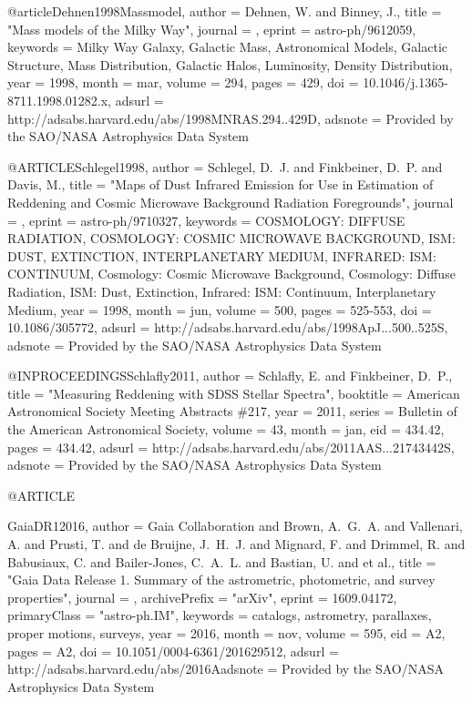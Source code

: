 \documentclass[apj]{emulateapj}
\begin{document}
{{{{{{{{{{{{@article{Dehnen1998Massmodel,
   author = {{Dehnen}, W. and {Binney}, J.},
    title = "{Mass models of the Milky Way}",
  journal = {\mnras},
   eprint = {astro-ph/9612059},
 keywords = {Milky Way Galaxy, Galactic Mass, Astronomical Models, Galactic Structure, Mass Distribution, Galactic Halos, Luminosity, Density Distribution},
     year = 1998,
    month = mar,
   volume = 294,
    pages = {429},
      doi = {10.1046/j.1365-8711.1998.01282.x},
   adsurl = {http://adsabs.harvard.edu/abs/1998MNRAS.294..429D},
  adsnote = {Provided by the SAO/NASA Astrophysics Data System}
}


@ARTICLE{Schlegel1998,
   author = {{Schlegel}, D.~J. and {Finkbeiner}, D.~P. and {Davis}, M.},
    title = "{Maps of Dust Infrared Emission for Use in Estimation of Reddening and Cosmic Microwave Background Radiation Foregrounds}",
  journal = {\apj},
   eprint = {astro-ph/9710327},
 keywords = {COSMOLOGY: DIFFUSE RADIATION, COSMOLOGY: COSMIC MICROWAVE BACKGROUND, ISM: DUST, EXTINCTION, INTERPLANETARY MEDIUM, INFRARED: ISM: CONTINUUM, Cosmology: Cosmic Microwave Background, Cosmology: Diffuse Radiation, ISM: Dust, Extinction, Infrared: ISM: Continuum, Interplanetary Medium},
     year = 1998,
    month = jun,
   volume = 500,
    pages = {525-553},
      doi = {10.1086/305772},
   adsurl = {http://adsabs.harvard.edu/abs/1998ApJ...500..525S},
  adsnote = {Provided by the SAO/NASA Astrophysics Data System}
}



@INPROCEEDINGS{Schlafly2011,
   author = {{Schlafly}, E. and {Finkbeiner}, D.~P.},
    title = "{Measuring Reddening with SDSS Stellar Spectra}",
booktitle = {American Astronomical Society Meeting Abstracts \#217},
     year = 2011,
   series = {Bulletin of the American Astronomical Society},
   volume = 43,
    month = jan,
      eid = {434.42},
    pages = {434.42},
   adsurl = {http://adsabs.harvard.edu/abs/2011AAS...21743442S},
  adsnote = {Provided by the SAO/NASA Astrophysics Data System}
}


@ARTICLE{GaiaDR12016,
   author = {{Gaia Collaboration} and {Brown}, A.~G.~A. and {Vallenari}, A. and 
	{Prusti}, T. and {de Bruijne}, J.~H.~J. and {Mignard}, F. and 
	{Drimmel}, R. and {Babusiaux}, C. and {Bailer-Jones}, C.~A.~L. and 
	{Bastian}, U. and et al.},
    title = "{Gaia Data Release 1. Summary of the astrometric, photometric, and survey properties}",
  journal = {\aap},
archivePrefix = "arXiv",
   eprint = {1609.04172},
 primaryClass = "astro-ph.IM",
 keywords = {catalogs, astrometry, parallaxes, proper motions, surveys},
     year = 2016,
    month = nov,
   volume = 595,
      eid = {A2},
    pages = {A2},
      doi = {10.1051/0004-6361/201629512},
   adsurl = {http://adsabs.harvard.edu/abs/2016Aadsnote = {Provided by the SAO/NASA Astrophysics Data System}
}


}}}}}}}}}}}}}
\end{document}
